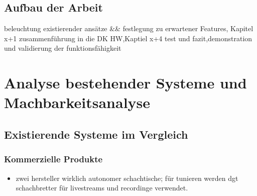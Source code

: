 \hypertarget{aufbau-der-arbeit}{%
\subsection{Aufbau der Arbeit}\label{aufbau-der-arbeit}}

beleuchtung existierender ansätze \&\& festlegung zu erwartener
Features, Kapitel x+1 zusammenführung in die DK HW,Kaptiel x+4 test und
fazit,demonstration und validierung der funktionsfähigkeit

\hypertarget{analyse-bestehender-systeme-und-machbarkeitsanalyse}{%
\section{Analyse bestehender Systeme und
Machbarkeitsanalyse}\label{analyse-bestehender-systeme-und-machbarkeitsanalyse}}

\hypertarget{existierende-systeme-im-vergleich}{%
\subsection{Existierende Systeme im
Vergleich}\label{existierende-systeme-im-vergleich}}

\hypertarget{kommerzielle-produkte}{%
\subsubsection{Kommerzielle Produkte}\label{kommerzielle-produkte}}

\begin{itemize}
\tightlist
\item
  zwei hersteller wirklich autonomer schachtische; für tunieren werden
  dgt schachbretter für livestreams und recordinge verwendet.
\end{itemize}

